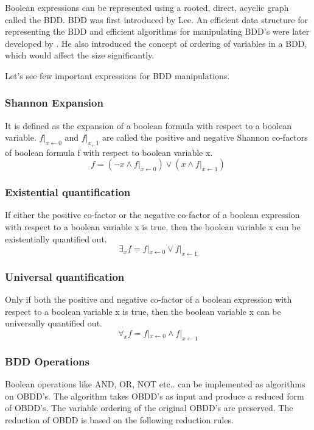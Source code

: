 Boolean expressions can be represented using a rooted, direct, acyclic graph called the BDD. BDD was first introduced by Lee\cite{Lee 1959}. An efficient data structure for representing the BDD and efficient algorithms for manipulating BDD's were later developed by \cite{Bryant 1986}. He also introduced the concept of ordering of variables in a BDD, which would affect the size significantly. 

Let's see few important expressions for BDD manipulations.

\subsubsection*{Shannon Expansion}
It is defined as the expansion of a boolean formula with respect to a boolean variable. $f|_{x\leftarrow 0}$ and $f|_{x_\leftarrow 1}$ are called the positive and negative Shannon co-factors of  boolean formula f with respect to boolean variable x.
\begin{equation}
\label{shannon}
f=(\neg x\land f|_{x\leftarrow 0}) \lor (x\land f|_{x\leftarrow 1})
\end{equation}

\subsubsection*{Existential quantification}
If either the positive co-factor or the negative co-factor of a boolean expression with respect to a boolean variable x is true, then the boolean variable x can be existentially quantified out.
\begin{equation}
\label{eqn:EQ}
\exists_xf=f|_{x\leftarrow 0} \lor f|_{x\leftarrow 1}
\end{equation}


\subsubsection*{Universal quantification}
Only if both the positive and negative co-factor of a boolean expression with respect to a boolean variable x is true, then the boolean variable x can be universally quantified out. 
\begin{equation}
\label{UQ}
\forall_xf=f|_{x\leftarrow 0} \land f|_{x\leftarrow 1}
\end{equation}

\subsubsection*{BDD Operations}
Boolean operations like AND, OR, NOT etc.. can be implemented as algorithms on OBDD's. The algorithm takes OBDD's as input and produce a reduced form of OBDD's\cite{Bryant 1986}. The variable ordering of the original OBDD's are preserved. The reduction of OBDD is based on the following reduction rules.

